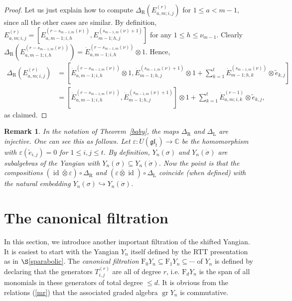 \documentclass[twoside,12pt,reqno]{amsart}
\newtheorem{Remark}[Proposition]{Remark}
\def\id{\operatorname{id}}
\def\rt{{\operatorname{\scriptscriptstyle R}}}
\def\lt{{\operatorname{\scriptscriptstyle L}}}
\def\C{{\mathbb C}}
\def\F{\mathrm{F}}
\def\gr{\operatorname{gr}}
\def\eps{{\varepsilon}}
\begin{document}
\begin{proof}
Let us just explain how to compute
$\Delta_{\rt}(E_{a,m;i,j}^{(r)})$ for $1 \leq a < m-1$, since all the other cases are similar.
By definition, 
$E_{a,m;i,j}^{(r)} = 
[E_{a,m-1;i,h}^{(r-s_{m-1,m}(\nu))},
E_{m-1;h,j}^{(s_{m-1,m}(\nu)+1)}]$
for any $1 \leq h \leq \nu_{m-1}$.
Clearly
$\Delta_{\rt}(E_{a,m-1;i,h}^{(r-s_{m-1,m}(\nu))})
= \dot E_{a,m-1;i,h}^{(r-s_{m-1,m}(\nu))} \otimes 1$. Hence,
\begin{align*}
\Delta_{\rt}(E_{a,m;i,j}^{(r)})&=
\left[\dot E_{a,m-1;i,h}^{(r-s_{m-1,m}(\nu))} \otimes 1,
\dot E_{m-1;h,j}^{(s_{m-1,m}(\nu)+1)} \otimes 1
+ \sum_{k=1}^{t}\dot E_{m-1;h,k}^{(s_{m-1,m}(\nu))} \otimes \tilde e_{k,j}\right]\\
&=
\left[\dot E_{a,m-1;i,h}^{(r-s_{m-1,m}(\nu))},\dot E_{m-1;h,j}^{(s_{m-1,m}(\nu)+1)}\right ] \otimes 1
+ \sum_{k=1}^{t}\dot E_{a,m;i,k}^{(r-1)} \otimes \tilde e_{k,j},
\end{align*}
as claimed.
\end{proof}

\begin{Remark}\label{areinj}\rm
In the notation of Theorem~\ref{baby},
the maps $\Delta_{\rt}$ and $\Delta_{\lt}$ are injective.
One can see this as follows.
Let $\eps:U(\mathfrak{gl}_t) \rightarrow \C$ be the homomorphism
with $\eps(\tilde e_{i,j})=0$ for $1 \leq i,j \leq t$. By definition,
$Y_n(\sigma)$ and $Y_n(\dot \sigma)$ are subalgebras of the
Yangian with $Y_n(\sigma) \subseteq Y_n(\dot\sigma)$.
Now the point is that the compositions
$(\id \bar\otimes \eps) \circ \Delta_{\rt}$
and $(\eps \bar\otimes \id)\circ \Delta_{\lt}$  
coincide (when defined) with
the natural embedding
$Y_n(\sigma) \hookrightarrow Y_n(\dot\sigma)$.
\end{Remark}

\section{The canonical filtration}\label{scan}

In this section, we introduce another important filtration
of the shifted Yangian. It is easiest to start
with the Yangian $Y_n$ itself defined by the RTT presentation
as in $\S$\ref{sparabolic}. The {\em canonical filtration}
$\F_0 Y_n \subseteq \F_1 Y_n \subseteq \cdots$ of $Y_n$
is defined by declaring that the generators $T_{i,j}^{(r)}$
are all of degree $r$, i.e. $\F_d Y_n$ is the span of all monomials
in these generators of total degree $\leq d$. It is obvious from
the relations (\ref{mr}) that the associated graded
algebra $\gr Y_n$ is commutative.
\end{document}
